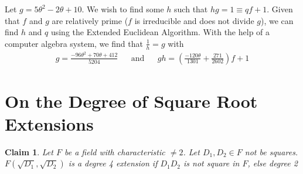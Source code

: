 \documentclass[12pt]{article}
\newtheorem*{claim*}{Claim}
\begin{document}
Let $g = 5\theta^2 - 2\theta + 10$. We wish to find some $h$ such that $hg = 1 \equiv qf + 1$. Given that $f$ and $g$ are relatively prime ($f$ is irreducible and does not divide $g$), we can find $h$ and $q$ using the Extended Euclidean Algorithm. With the help of a computer algebra system, we find that $\frac{1}{h} = g$ with
\begin{align*}
g = \frac{-96 \theta^2 + 70\theta + 412}{5204} 
&& \text{and} && 
gh = \left(\frac{-120\theta}{1301} + \frac{271}{2602}\right)f + 1
\end{align*}

\section{On the Degree of Square Root Extensions}
\begin{claim*}
Let $F$ be a field with characteristic $\neq 2$. Let $D_1, D_2 \in F$ not be squares. $F(\sqrt{D_1}, \sqrt{D_2})$ is a degree 4 extension if $D_1D_2$ is not square in $F$, else degree 2
\end{claim*}
\end{document}
